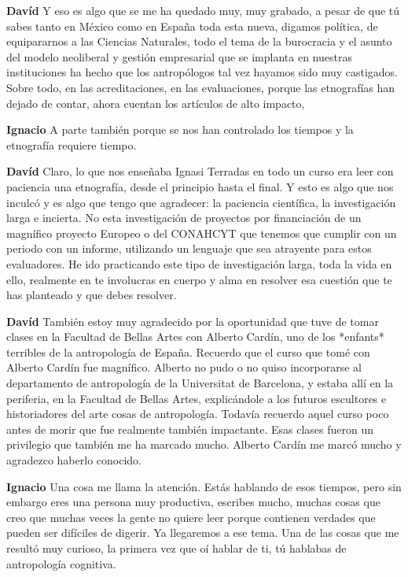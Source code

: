 \documentclass[
  spanish,
  11pt,
  a4paper,
]{scrbook}
\newenvironment{transcripcion}{
    \begin{list}{}{
        \setlength{\leftmargin}{1.5em}  %
        \setlength{\rightmargin}{0em}
        \setlength{\itemsep}{0.2em}     %
        \setlength{\parsep}{0.0em}
        \setlength{\listparindent}{0pt}
    }
}{
    \end{list}
}
\newcommand{\personaje}[1]{\textbf{#1}\quad}
\begin{document}
\begin{transcripcion}
\item \personaje{Davíd} Y eso es algo que se me ha quedado muy, muy grabado, a pesar de que tú sabes tanto en México como en España toda esta nueva, digamos política, de equipararnos a las Ciencias Naturales, todo el tema de la burocracia y el asunto del modelo neoliberal y gestión empresarial que se implanta en nuestras instituciones ha hecho que los antropólogos tal vez hayamos sido muy castigados. Sobre todo, en las acreditaciones, en las evaluaciones, porque las etnografías han dejado de contar, ahora cuentan los artículos de alto impacto,

\item \personaje{Ignacio} A parte también porque se nos han controlado los tiempos y la etnografía requiere tiempo.

\item \personaje{Davíd} Claro, lo que nos enseñaba Ignasi Terradas en todo un curso era leer con paciencia una etnografía, desde el principio hasta el final. Y esto es algo que nos inculcó y es algo que tengo que agradecer: la paciencia científica, la investigación larga e incierta. No esta investigación de proyectos por financiación de un magnífico proyecto Europeo o del CONAHCYT que tenemos que cumplir con un periodo con un informe, utilizando un lenguaje que sea atrayente para estos evaluadores. He ido practicando este tipo de investigación larga, toda la vida en ello, realmente en te involucras en cuerpo y alma en resolver esa cuestión que te has planteado y que debes resolver.

\item \personaje{Davíd} También estoy muy agradecido por la oportunidad que tuve de tomar clases en la Facultad de Bellas Artes con Alberto Cardín, uno de los *enfants* terribles de la antropología de España. Recuerdo que el curso que tomé con Alberto Cardín fue magnífico. Alberto no pudo o no quiso incorporarse al departamento de antropología de la Universitat de Barcelona, y estaba allí en la periferia, en la Facultad de Bellas Artes, explicándole a los futuros escultores e historiadores del arte cosas de antropología. Todavía recuerdo aquel curso poco antes de morir que fue realmente también impactante. Esas clases fueron un privilegio que también me ha marcado mucho. Alberto Cardín me marcó mucho y agradezco haberlo conocido.

\item \personaje{Ignacio} Una cosa me llama la atención. Estás hablando de esos tiempos, pero sin embargo eres una persona muy productiva, escribes mucho, muchas cosas que creo que muchas veces la gente no quiere leer porque contienen verdades que pueden ser difíciles de digerir. Ya llegaremos a ese tema. Una de las cosas que me resultó muy curioso, la primera vez que oí hablar de ti, tú hablabas de antropología cognitiva.


\end{transcripcion}
\end{document}
